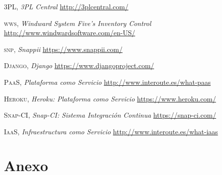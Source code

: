 \documentclass[a4paper,11pt]{book}
\begin{document}
\begin{thebibliography}{aaaa}

 \textsc{3PL},
\textit{3PL Central}
\url{http://3plcentral.com/} 

 \textsc{wws},
\textit{Windward System Five's Inventory Control}
\url{http://www.windwardsoftware.com/en-US/}

 \textsc{snp},
\textit{Snappii}
\url{https://www.snappii.com/}

 \textsc{Django},
\textit{Django}
\url{https://www.djangoproject.com/}


 \textsc{PaaS},
\textit{Plataforma como Servicio}
\url{http://www.interoute.es/what-paas} 

 \textsc{Heroku},
\textit{Heroku: Plataforma como Servicio}
\url{https://www.heroku.com/}

 \textsc{Snap-CI},
\textit{Snap-CI: Sistema Integración Continua}
\url{https://snap-ci.com/}

 \textsc{IaaS},
\textit{Infraestructura como Servicio}
\url{http://www.interoute.es/what-iaas} 

\end{thebibliography}
 

\chapter{Anexo}




%
%
%
%
%
%
%
%
%
%
%
%
%
%
%
%
%

%
%
%
\chapter*{}
\thispagestyle{empty}
\end{document}
